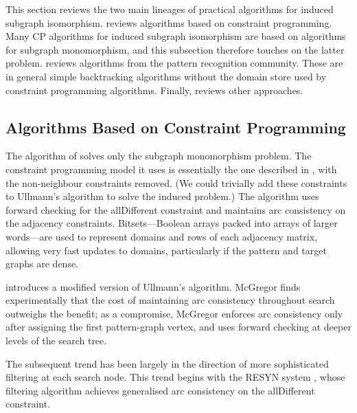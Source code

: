 This section reviews the two main lineages of practical algorithms
for induced subgraph isomorphism.   reviews algorithms
based on constraint programming.  Many CP algorithms for induced subgraph
isomorphism are based on algorithms for subgraph monomorphism, and this
subsection therefore touches on the latter problem.  
reviews algorithms from the pattern recognition community. These are in general
simple backtracking algorithms without the domain store used by constraint
programming algorithms.  Finally,  reviews
other approaches.

\subsection{Algorithms Based on Constraint Programming}\label{subsec:cp-sip}

The algorithm of \citet{ullmann1976algorithm} solves only the subgraph
monomorphism problem.  The constraint programming model it uses is essentially
the one described in , with the non-neighbour
constraints removed.  (We could trivially add these constraints to Ullmann's
algorithm to solve the induced problem.) The algorithm uses forward checking
for the allDifferent constraint and maintains arc consistency on the adjacency
constraints.
Bitsets---Boolean arrays
packed into arrays of larger words---are used to represent domains and rows of each
adjacency matrix, allowing very fast updates to domains, particularly
if the pattern and target graphs are dense.

\citet{DBLP:journals/isci/McGregor79} introduces a modified version of
Ullmann's algorithm.  McGregor finds experimentally that the cost of
maintaining arc consistency throughout search outweighs the benefit; as a
compromise, McGregor enforces arc consistency only after assigning the first
pattern-graph vertex, and uses forward checking at deeper levels of the search
tree.

The subsequent trend has been largely in the direction of more sophisticated
filtering at each search node.  This trend begins with the RESYN system
\citep{vism92,regin1995developpement}, whose filtering algorithm achieves
generalised arc consistency on the allDifferent constraint.

